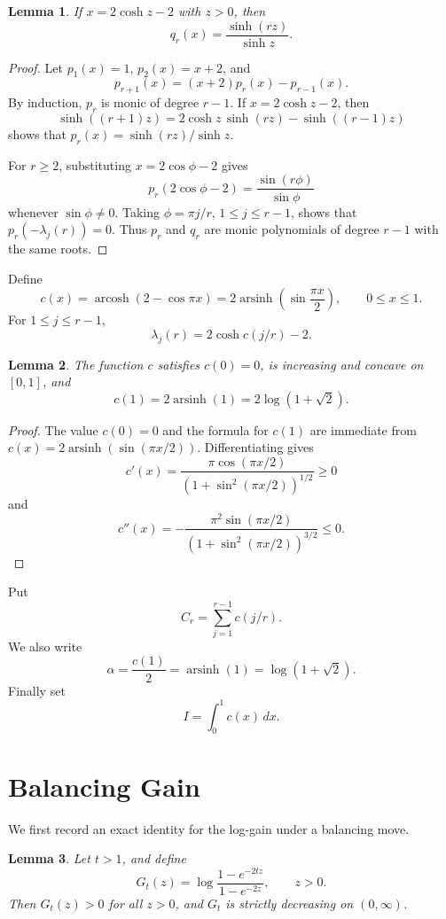 \documentclass[11pt]{article}
\numberwithin{equation}{section}
\newtheorem{lemma}[lemma]{Lemma}
\DeclareMathOperator{\arcosh}{arcosh}
\DeclareMathOperator{\arsinh}{arsinh}
\newcommand{\dd}{\,d}
\begin{document}
\begin{lemma}\label{lem:hyperbolic}
If $x=2\cosh z-2$ with $z>0$, then
\[
  q_r(x)=\frac{\sinh(rz)}{\sinh z}.
\]
\end{lemma}

\begin{proof}
Let $p_1(x)=1$, $p_2(x)=x+2$, and
\[
  p_{r+1}(x)=(x+2)p_r(x)-p_{r-1}(x).
\]
By induction, $p_r$ is monic of degree $r-1$. If $x=2\cosh z-2$, then
\[
  \sinh((r+1)z)=2\cosh z\,\sinh(rz)-\sinh((r-1)z)
\]
shows that $p_r(x)=\sinh(rz)/\sinh z$.

For $r\ge2$, substituting $x=2\cos\phi-2$ gives
\[
  p_r(2\cos\phi-2)=\frac{\sin(r\phi)}{\sin\phi}
\]
whenever $\sin\phi\ne0$. Taking $\phi=\pi j/r$, $1\le j\le r-1$, shows that $p_r(-\lambda_j(r))=0$. Thus $p_r$ and $q_r$ are monic polynomials of degree $r-1$ with the same roots.
\end{proof}

Define
\[
  c(x)=\arcosh(2-\cos\pi x)
  =
  2\arsinh\left(\sin\frac{\pi x}{2}\right),
  \qquad 0\le x\le1.
\]
For $1\le j\le r-1$,
\begin{equation}\label{eq:lambda-c}
  \lambda_j(r)=2\cosh c(j/r)-2.
\end{equation}

\begin{lemma}\label{lem:c}
The function $c$ satisfies $c(0)=0$, is increasing and concave on $[0,1]$, and
\[
  c(1)=2\arsinh(1)=2\log(1+\sqrt{2}).
\]
\end{lemma}

\begin{proof}
The value $c(0)=0$ and the formula for $c(1)$ are immediate from
$c(x)=2\arsinh(\sin(\pi x/2))$.
Differentiating gives
\[
  c'(x)=\frac{\pi\cos(\pi x/2)}{(1+\sin^2(\pi x/2))^{1/2}}\ge0
\]
and
\[
  c''(x)=
  -\frac{\pi^2\sin(\pi x/2)}
  {(1+\sin^2(\pi x/2))^{3/2}}
  \le0.
\]
\end{proof}

Put
\[
  C_r=\sum_{j=1}^{r-1}c(j/r).
\]
We also write
\[
  \alpha=\frac{c(1)}{2}=\arsinh(1)=\log(1+\sqrt{2}).
\]
Finally set
\[
  I=\int_0^1c(x)\dd x.
\]

\section{Balancing Gain}\label{sec:balancing-gain}

We first record an exact identity for the log-gain under a balancing move.

\begin{lemma}\label{lem:G}
Let $t>1$, and define
\[
  G_t(z)=\log\frac{1-e^{-2tz}}{1-e^{-2z}},
  \qquad z>0.
\]
Then $G_t(z)>0$ for all $z>0$, and $G_t$ is strictly decreasing on $(0,\infty)$.
\end{lemma}
\end{document}

